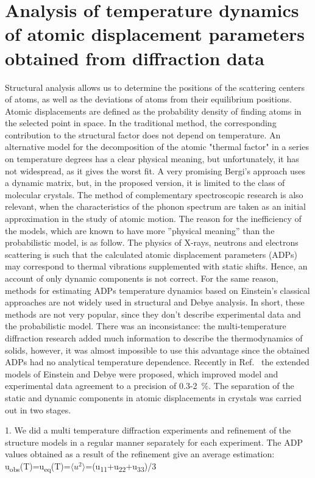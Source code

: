 \documentclass[preprint,review,12pt]{elsarticle}
\begin{document}
\section{Analysis of temperature dynamics of atomic displacement parameters obtained from diffraction data}\label{sec:level1}
Structural analysis allows us to determine the positions of the scattering centers of atoms, as well as the deviations of atoms from their equilibrium positions.
Atomic displacements are defined as the probability density of finding atoms in the selected point in space. In the traditional method, the corresponding contribution to the structural factor does not depend on temperature\cite{willis1975thermal}.
An alternative model for the decomposition of the atomic "thermal factor" in a series on temperature degrees has a clear physical meaning\cite{willis1975thermal}, but unfortunately, it has not widespread, as it gives the worst fit.
A very promising Bergi's approach\cite{Brgi2000} uses a dynamic matrix, but, in the proposed version, it is limited to the class of molecular crystals.
The method of complementary spectroscopic research is also relevant, when the characteristics of the phonon spectrum are taken as an initial approximation in the study of atomic motion\cite{Hoser2016}.
The reason for the inefficiency of the models, which are known to have more ”physical meaning” than the probabilistic model, is as follow.
The physics of X-rays, neutrons and electrons scattering is such that the calculated atomic displacement parameters (ADPs) may correspond to thermal vibrations supplemented with static shifts\cite{Trueblood1996}.
Hence, an account of only dynamic components is not correct. For the same reason, methods for estimating ADPs temperature dynamics based on Einstein's classical approaches are not widely used in structural and Debye analysis\cite{Einstein1907,Debye1914}.
In short, these methods are not very popular, since they don't describe experimental data and the probabilistic model.
There was an inconsistance: the multi-temperature diffraction research added much information to describe the thermodynamics of solids,
however, it was almost impossible to use this advantage since the obtained ADPs had no analytical temperature dependence.
Recently in Ref.~\cite{Dudka2019} the extended models of Einstein and Debye were proposed, which improved model and experimental data agreement to a precision of 0.3-2~\%.
The separation of the static and dynamic components in atomic displacements in crystals was carried out in two stages.

1. We did a multi temperature diffraction experiments and refinement of the structure models in a regular manner separately for each experiment. The ADP values obtained as a result of the refinement give an average estimation:
u\textsubscript{obs}(T)=u\textsubscript{eq}(T)=$\langle u^2 \rangle$=(u\textsubscript{11}+u\textsubscript{22}+u\textsubscript{33})/3
\end{document}

